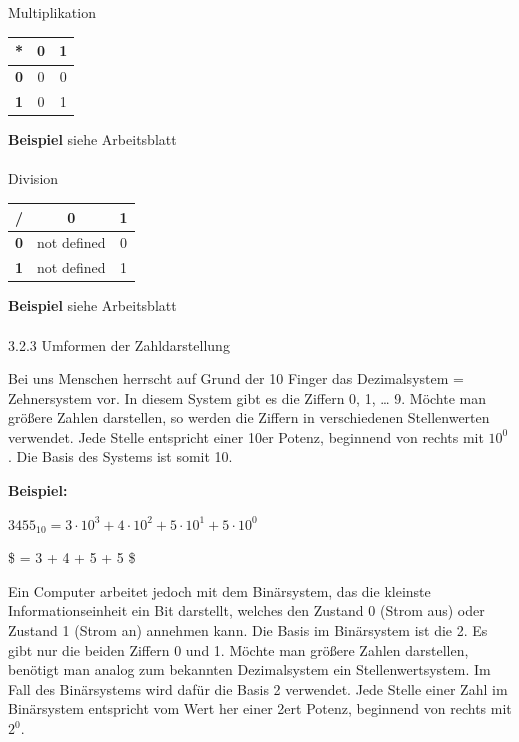 \documentclass[
  11pt,
  a4paper,
  DIV=11,
  numbers=noendperiod]{scrartcl}
\makeatletter
\let\oldparagraph\paragraph
\renewcommand{\paragraph}{
    \@ifstar
      \xxxParagraphStar
      \xxxParagraphNoStar
  }
\newcommand{\xxxParagraphStar}[1]{\oldparagraph*{#1}\mbox{}}
\newcommand{\xxxParagraphNoStar}[1]{\oldparagraph{#1}\mbox{}}
\let\oldsubparagraph\subparagraph
\renewcommand{\subparagraph}{
    \@ifstar
      \xxxSubParagraphStar
      \xxxSubParagraphNoStar
  }
\newcommand{\xxxSubParagraphStar}[1]{\oldsubparagraph*{#1}\mbox{}}
\newcommand{\xxxSubParagraphNoStar}[1]{\oldsubparagraph{#1}\mbox{}}
\makeatother
\begin{document}
\subparagraph{Multiplikation}\label{multiplikation}

\begin{longtable}[]{@{}ccc@{}}
\toprule\noalign{}
* & 0 & 1 \\
\midrule\noalign{}
\endhead
\bottomrule\noalign{}
\endlastfoot
\textbf{0} & 0 & 0 \\
\textbf{1} & 0 & 1 \\
\end{longtable}

\textbf{Beispiel} siehe Arbeitsblatt

\paragraph{Division}\label{division}

\begin{longtable}[]{@{}ccc@{}}
\toprule\noalign{}
/ & 0 & 1 \\
\midrule\noalign{}
\endhead
\bottomrule\noalign{}
\endlastfoot
\textbf{0} & not defined & 0 \\
\textbf{1} & not defined & 1 \\
\end{longtable}

\textbf{Beispiel} siehe Arbeitsblatt

\paragraph{3.2.3 Umformen der
Zahldarstellung}\label{umformen-der-zahldarstellung}

Bei uns Menschen herrscht auf Grund der 10 Finger das Dezimalsystem =
Zehnersystem vor. In diesem System gibt es die Ziffern 0, 1, \ldots{} 9.
Möchte man größere Zahlen darstellen, so werden die Ziffern in
verschiedenen Stellenwerten verwendet. Jede Stelle entspricht einer 10er
Potenz, beginnend von rechts mit \(10^0\). Die Basis des Systems ist
somit 10.

\textbf{Beispiel:}

\(3455_{10}=3\cdot 10^3+4\cdot 10^2+5\cdot 10^1+5\cdot 10^0\)

\$ = 3 + 4  + 5  + 5 \$

Ein Computer arbeitet jedoch mit dem Binärsystem, das die kleinste
Informationseinheit ein Bit darstellt, welches den Zustand 0 (Strom aus)
oder Zustand 1 (Strom an) annehmen kann. Die Basis im Binärsystem ist
die 2. Es gibt nur die beiden Ziffern 0 und 1. Möchte man größere Zahlen
darstellen, benötigt man analog zum bekannten Dezimalsystem ein
Stellenwertsystem. Im Fall des Binärsystems wird dafür die Basis 2
verwendet. Jede Stelle einer Zahl im Binärsystem entspricht vom Wert her
einer 2ert Potenz, beginnend von rechts mit \(2^0\).
\end{document}
